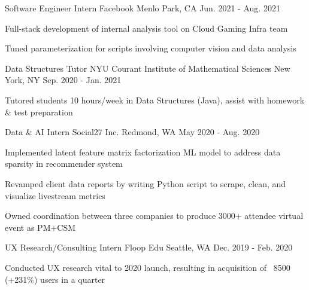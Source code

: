 

\begin{cventries}

  \cventry
    {Software Engineer Intern} %
    {Facebook} %
    {Menlo Park, CA} %
    {Jun. 2021 - Aug. 2021} %
    {
      \begin{cvitems} %
        \item {Full-stack development of internal analysis tool on Cloud Gaming Infra team}
        \item {Tuned parameterization for scripts involving computer vision and data analysis}
      \end{cvitems}
    }

    \cventry
    {Data Structures Tutor} %
    {NYU Courant Institute of Mathematical Sciences} %
    {New York, NY} %
    {Sep. 2020 - Jan. 2021} %
    {
      \begin{cvitems} %
        \item {Tutored students 10 hours/week in Data Structures (Java), assist with homework \& test preparation}
      \end{cvitems}
    }

  \cventry
    {Data \& AI Intern} %
    {Social27 Inc.} %
    {Redmond, WA} %
    {May 2020 - Aug. 2020} %
    {
      \begin{cvitems} %
        \item {Implemented latent feature matrix factorization ML model to address data sparsity in recommender system}
        \item {Revamped client data reports by writing Python script to scrape, clean, and visualize livestream metrics}
        \item {Owned coordination between three companies to produce 3000+ attendee virtual event as PM+CSM}
      \end{cvitems}
    }

  \cventry
    {UX Research/Consulting Intern} %
    {Floop Edu} %
    {Seattle, WA} %
    {Dec. 2019 - Feb. 2020} %
    {
      \begin{cvitems} %
        \item {Conducted UX research vital to 2020 launch, resulting in acquisition of ~8500 (+231\%) users in a quarter}
      \end{cvitems}
    }

\end{cventries}